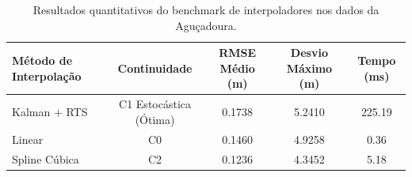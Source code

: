 \begin{table}[H]
\centering
\small
\begin{tabular}{lcccc}
\toprule
\textbf{Método de Interpolação} & \textbf{Continuidade} & \textbf{RMSE Médio (m)} & \textbf{Desvio Máximo (m)} & \textbf{Tempo (ms)} \\
\midrule
Kalman + RTS & C1 Estocástica (Ótima) & 0.1738 & 5.2410 & 225.19 \\
Linear & C0 & 0.1460 & 4.9258 & 0.36 \\
Spline Cúbica & C2 & 0.1236 & 4.3452 & 5.18 \\
\bottomrule
\end{tabular}
\caption{Resultados quantitativos do benchmark de interpoladores nos dados da Aguçadoura.}
\end{table}